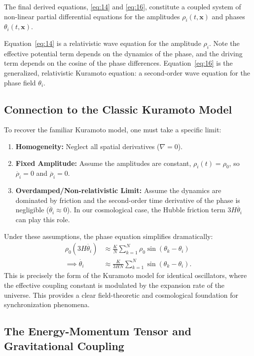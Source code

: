 The final derived equations, \eqref{eq:14} and \eqref{eq:16}, constitute a coupled system of non-linear partial differential equations for the amplitudes $\rho_i(t, \mathbf{x})$ and phases $\theta_i(t, \mathbf{x})$.

Equation~\eqref{eq:14} is a relativistic wave equation for the amplitude $\rho_i$. Note the effective potential term depends on the dynamics of the phase, and the driving term depends on the cosine of the phase differences. Equation~\eqref{eq:16} is the generalized, relativistic Kuramoto equation: a second-order wave equation for the phase field $\theta_i$.

\subsection{Connection to the Classic Kuramoto Model}
\label{subsec:kuramoto-limit}

To recover the familiar Kuramoto model, one must take a specific limit:
\begin{enumerate}
    \item \textbf{Homogeneity:} Neglect all spatial derivatives ($\nabla=0$).
    \item \textbf{Fixed Amplitude:} Assume the amplitudes are constant, $\rho_i(t) = \rho_0$, so $\dot{\rho_i}=0$ and $\ddot{\rho_i}=0$.
    \item \textbf{Overdamped/Non-relativistic Limit:} Assume the dynamics are dominated by friction and the second-order time derivative of the phase is negligible ($\ddot{\theta_i} \approx 0$). In our cosmological case, the Hubble friction term $3H\dot{\theta_i}$ can play this role.
\end{enumerate}
Under these assumptions, the phase equation simplifies dramatically:
\begin{align*}
    \rho_0(3H\dot{\theta_i}) &\approx \frac{K}{N} \sum_{k=1}^N \rho_0 \sin(\theta_k - \theta_i) \\
    \implies \dot{\theta_i} &\approx \frac{K}{3HN} \sum_{k=1}^N \sin(\theta_k - \theta_i) .
\end{align*}
This is precisely the form of the Kuramoto model for identical oscillators, where the effective coupling constant is modulated by the expansion rate of the universe. This provides a clear field-theoretic and cosmological foundation for synchronization phenomena.

\subsection{The Energy-Momentum Tensor and Gravitational Coupling}
\label{subsec:emt}

